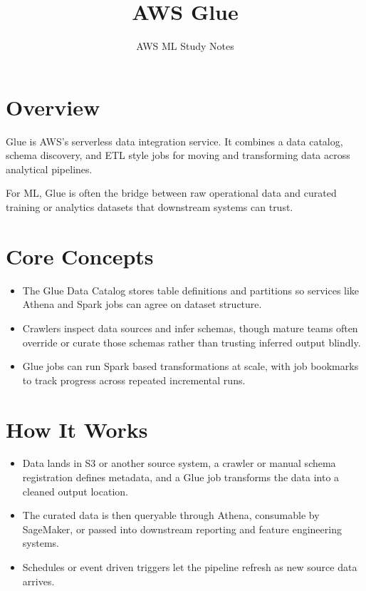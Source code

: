 \documentclass[10pt,twocolumn]{article}
\begin{document}
\title{\vspace{-1.6cm}AWS Glue}
\author{AWS ML Study Notes}
\date{}
\maketitle
\small

\section*{Overview}
Glue is AWS's serverless data integration service. It combines a data catalog, schema discovery, and ETL style jobs for moving and transforming data across analytical pipelines.

For ML, Glue is often the bridge between raw operational data and curated training or analytics datasets that downstream systems can trust.

\section*{Core Concepts}
\begin{itemize}
\item The Glue Data Catalog stores table definitions and partitions so services like Athena and Spark jobs can agree on dataset structure.
\item Crawlers inspect data sources and infer schemas, though mature teams often override or curate those schemas rather than trusting inferred output blindly.
\item Glue jobs can run Spark based transformations at scale, with job bookmarks to track progress across repeated incremental runs.
\end{itemize}

\section*{How It Works}
\begin{itemize}
\item Data lands in S3 or another source system, a crawler or manual schema registration defines metadata, and a Glue job transforms the data into a cleaned output location.
\item The curated data is then queryable through Athena, consumable by SageMaker, or passed into downstream reporting and feature engineering systems.
\item Schedules or event driven triggers let the pipeline refresh as new source data arrives.
\end{itemize}
\end{document}
